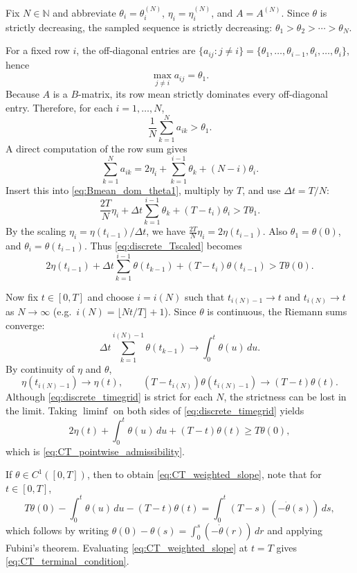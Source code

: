\documentclass[final,3p,authoryear,12pt]{elsarticle}
\begin{document}
Fix $N\in\mathbb{N}$ and abbreviate $\theta_i=\theta_i^{(N)}$,
$\eta_i=\eta_i^{(N)}$, and $A=A^{(N)}$.
Since $\theta$ is strictly decreasing, the sampled sequence is strictly
decreasing:
$\theta_1>\theta_2>\cdots>\theta_N$.

For a fixed row $i$, the off-diagonal entries are
$\{a_{ij}:j\neq i\}=\{\theta_1,\dots,\theta_{i-1},\theta_i,\dots,\theta_i\}$,
hence
\[
\max_{j\neq i} a_{ij}=\theta_1.
\]
Because $A$ is a $B$-matrix, its row mean strictly dominates every off-diagonal
entry. Therefore, for each $i=1,\dots,N$,
\begin{equation}
\label{eq:Bmean_dom_theta1}
\frac{1}{N}\sum_{k=1}^{N}a_{ik}>\theta_1.
\end{equation}
A direct computation of the row sum gives
\[
\sum_{k=1}^{N}a_{ik}
=
2\eta_i+\sum_{k=1}^{i-1}\theta_k+(N-i)\theta_i.
\]
Insert this into \eqref{eq:Bmean_dom_theta1}, multiply by $T$, and use $\Delta t=T/N$:
\begin{equation}
\label{eq:discrete_Tscaled}
\frac{2T}{N}\eta_i+\Delta t\sum_{k=1}^{i-1}\theta_k+(T-t_i)\theta_i
> T\theta_1.
\end{equation}
By the scaling $\eta_i=\eta(t_{i-1})/\Delta t$, we have
$\frac{2T}{N}\eta_i=2\eta(t_{i-1})$. Also $\theta_1=\theta(0)$, and
$\theta_i=\theta(t_{i-1})$. Thus \eqref{eq:discrete_Tscaled} becomes
\begin{equation}
\label{eq:discrete_timegrid}
2\eta(t_{i-1})
+\Delta t\sum_{k=1}^{i-1}\theta(t_{k-1})
+(T-t_i)\theta(t_{i-1})
> T\theta(0).
\end{equation}

Now fix $t\in[0,T]$ and choose $i=i(N)$ such that $t_{i(N)-1}\to t$ and
$t_{i(N)}\to t$ as $N\to\infty$ (e.g.\ $i(N)=\lfloor Nt/T\rfloor+1$).
Since $\theta$ is continuous, the Riemann sums converge:
\[
\Delta t\sum_{k=1}^{i(N)-1}\theta(t_{k-1})\longrightarrow \int_{0}^{t}\theta(u)\,du.
\]
By continuity of $\eta$ and $\theta$,
\[
\eta(t_{i(N)-1})\to\eta(t),\qquad (T-t_{i(N)})\theta(t_{i(N)-1})\to (T-t)\theta(t).
\]
	Although \eqref{eq:discrete_timegrid} is strict for each $N$, the strictness
	can be lost in the limit. Taking $\liminf$ on both sides of
	\eqref{eq:discrete_timegrid} yields
\[
2\eta(t)+\int_{0}^{t}\theta(u)\,du+(T-t)\theta(t)\ge T\theta(0),
\]
which is \eqref{eq:CT_pointwise_admissibility}.

If $\theta\in C^{1}([0,T])$, then to obtain \eqref{eq:CT_weighted_slope}, note
that for $t\in[0,T]$,
\[
T\theta(0)-\int_{0}^{t}\theta(u)\,du-(T-t)\theta(t)
=\int_{0}^{t}(T-s)\,(-\dot\theta(s))\,ds,
\]
which follows by writing $\theta(0)-\theta(s)=\int_{0}^{s}(-\dot\theta(r))\,dr$
and applying Fubini's theorem. Evaluating \eqref{eq:CT_weighted_slope} at $t=T$
gives \eqref{eq:CT_terminal_condition}.
\end{document}
